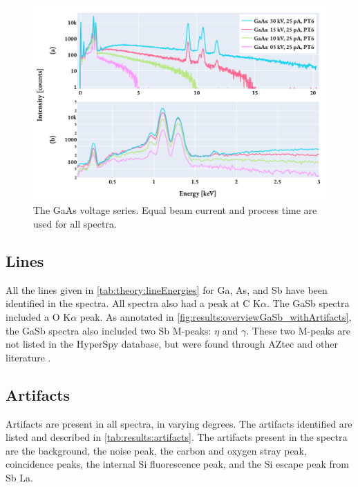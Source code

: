 \begin{figure}[hbtp]
    \centering
    \includegraphics[width=0.90\linewidth]{figures/results/GaAs_voltages.pdf}
    \caption{
        The GaAs voltage series.
        Equal beam current and process time are used for all spectra.
    }
    \label{fig:results:GaAs_voltages}
\end{figure}



\subsection*{Lines}
\label{results:qualitative_analysis:lines}

All the lines given in \cref{tab:theory:lineEnergies} for Ga, As, and Sb have been identified in the spectra.
All spectra also had a peak at C K$\alpha$.
The GaSb spectra included a O K$\alpha$ peak.
As annotated in \cref{fig:results:overviewGaSb_withArtifacts}, the GaSb spectra also included two Sb M-peaks: $\eta$ and $\gamma$.
These two M-peaks are not listed in the HyperSpy database, but were found through AZtec \cite{aztec_manual} and other literature \cite{liao2006practical}.






\subsection*{Artifacts}
\label{results:qualitative_analysis:artifacts}

Artifacts are present in all spectra, in varying degrees.
The artifacts identified are listed and described in \cref{tab:results:artifacts}.
The artifacts present in the spectra are the background, the noise peak, the carbon and oxygen stray peak, coincidence peaks, the internal Si fluorescence peak, and the Si escape peak from Sb La.

